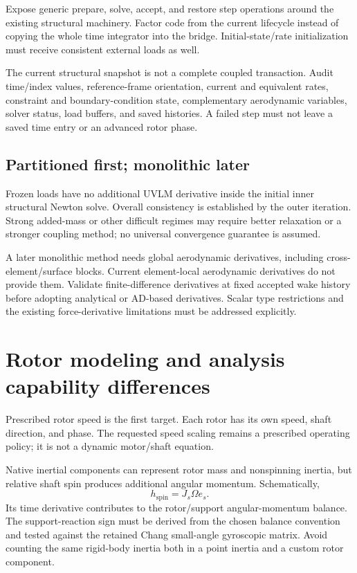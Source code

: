 \documentclass[11pt,a4paper]{article}
\begin{document}
Expose generic prepare, solve, accept, and restore step operations around the
existing structural machinery. Factor code from the current lifecycle instead
of copying the whole time integrator into the bridge. Initial-state/rate
initialization must receive consistent external loads as well.

The current structural snapshot is not a complete coupled transaction. Audit
time/index values, reference-frame orientation, current and equivalent rates,
constraint and boundary-condition state, complementary aerodynamic variables,
solver status, load buffers, and saved histories. A failed step must not leave
a saved time entry or an advanced rotor phase.

\subsection{Partitioned first; monolithic later}

Frozen loads have no additional UVLM derivative inside the initial inner
structural Newton solve. Overall consistency is established by the outer
iteration. Strong added-mass or other difficult regimes may require better
relaxation or a stronger coupling method; no universal convergence guarantee
is assumed.

A later monolithic method needs global aerodynamic derivatives, including
cross-element/surface blocks. Current element-local aerodynamic derivatives
do not provide them. Validate finite-difference derivatives at fixed accepted
wake history before adopting analytical or AD-based derivatives. Scalar type
restrictions and the existing force-derivative limitations must be addressed
explicitly.

\section{Rotor modeling and analysis capability differences}

Prescribed rotor speed is the first target. Each rotor has its own speed,
shaft direction, and phase. The requested speed scaling remains a prescribed
operating policy; it is not a dynamic motor/shaft equation.

Native inertial components can represent rotor mass and nonspinning inertia,
but relative shaft spin produces additional angular momentum. Schematically,
\begin{equation}
 h_{\mathrm{spin}}=J_s\Omega e_s.
\end{equation}
Its time derivative contributes to the rotor/support angular-momentum balance.
The support-reaction sign must be derived from the chosen balance convention
and tested against the retained Chang small-angle gyroscopic matrix. Avoid
counting the same rigid-body inertia both in a point inertia and a custom
rotor component.
\end{document}
